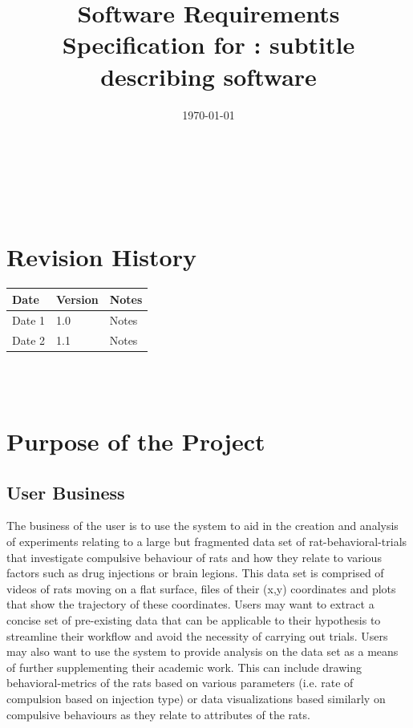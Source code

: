 \documentclass[12pt]{article}
\begin{document}
\title{Software Requirements Specification for \progname: subtitle describing software} 
\author{\authname}
\date{\today}
	
\maketitle

~\newpage


\tableofcontents

~\newpage

\section*{Revision History}

\begin{tabularx}{\textwidth}{p{3cm}p{2cm}X}
\toprule {\textbf{Date}} & {\textbf{Version}} & {\textbf{Notes}}\\
\midrule
Date 1 & 1.0 & Notes\\
Date 2 & 1.1 & Notes\\
\bottomrule
\end{tabularx}

~\\

~\newpage
\section{Purpose of the Project}
\subsection{User Business}

\par{The business of the user is to use the system to aid in the
creation and analysis of experiments relating to a large but fragmented data set
of \gls{rat-behavioral-trials} that investigate compulsive behaviour of rats and how they relate to various 
factors such as drug injections or brain legions. This data set is comprised of videos of rats
moving on a flat surface, files of their (x,y) coordinates and plots that show the \gls{trajectory} of these coordinates. Users may want to
extract a concise set of pre-existing data that can be applicable to
their hypothesis to streamline their workflow and avoid the necessity of carrying out trials.
Users may also want to use the system to provide analysis on the data set as a means of
further supplementing their academic work. This can include drawing \gls{behavioral-metrics} of the rats
based on various parameters (i.e. rate of compulsion based on injection type) or data visualizations
based similarly on compulsive behaviours as they relate to attributes of the rats.}
\end{document}
